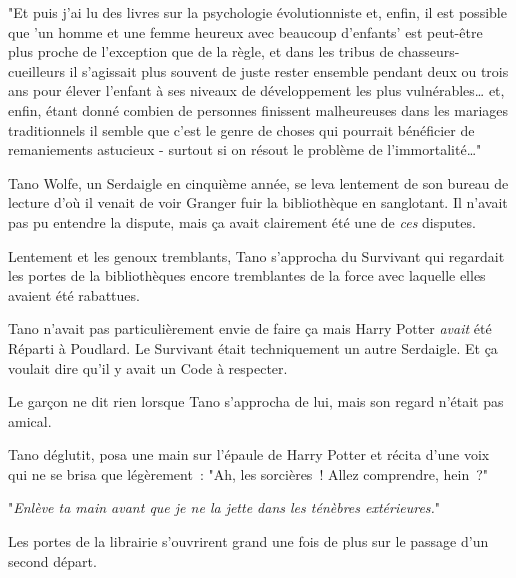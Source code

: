"Et puis j'ai lu des livres sur la psychologie évolutionniste et, enfin, il est possible que 'un homme et une femme heureux avec beaucoup d'enfants' est peut-être plus proche de l'exception que de la règle, et dans les tribus de chasseurs-cueilleurs il s'agissait plus souvent de juste rester ensemble pendant deux ou trois ans pour élever l'enfant à ses niveaux de développement les plus vulnérables… et, enfin, étant donné combien de personnes finissent malheureuses dans les mariages traditionnels il semble que c'est le genre de choses qui pourrait bénéficier de remaniements astucieux - surtout si on résout le problème de l'immortalité…"

\later

Tano Wolfe, un Serdaigle en cinquième année, se leva lentement de son bureau de lecture d'où il venait de voir Granger fuir la bibliothèque en sanglotant. Il n'avait pas pu entendre la dispute, mais ça avait clairement été une de \emph{ces} disputes.

Lentement et les genoux tremblants, Tano s'approcha du Survivant qui regardait les portes de la bibliothèques encore tremblantes de la force avec laquelle elles avaient été rabattues.

Tano n'avait pas particulièrement envie de faire ça mais Harry Potter \emph{avait} été Réparti à Poudlard. Le Survivant était techniquement un autre Serdaigle. Et ça voulait dire qu'il y avait un Code à respecter.

Le garçon ne dit rien lorsque Tano s'approcha de lui, mais son regard n'était pas amical.

Tano déglutit, posa une main sur l'épaule de Harry Potter et récita d'une voix qui ne se brisa que légèrement~: "Ah, les sorcières~! Allez comprendre, hein~?"

"\emph{Enlève ta main avant que je ne la jette dans les ténèbres extérieures.}"

Les portes de la librairie s'ouvrirent grand une fois de plus sur le passage d'un second départ. 

